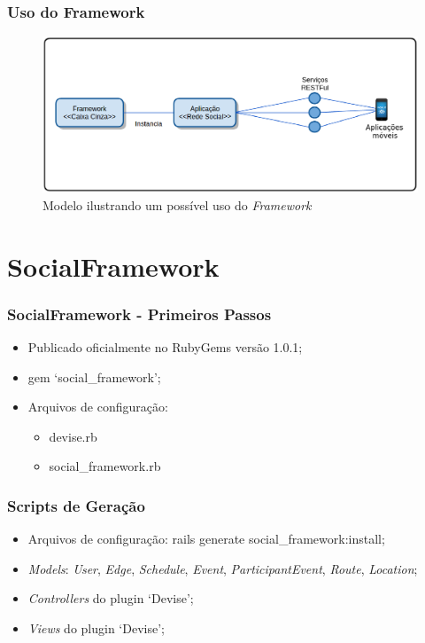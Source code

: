 \documentclass{beamer}
\begin{document}
\begin{frame}
\frametitle{Uso do Framework}

\begin{figure}[!h]
	\centering
	\includegraphics[scale=0.45]{../figuras/proposta/uso_proposto.eps}
	\caption{Modelo ilustrando um possível uso do \textit{Framework}}
	\label{uso_proposto}
\end{figure}

\end{frame}

\section{SocialFramework}

\begin{frame}
\frametitle{SocialFramework - Primeiros Passos}

\begin{itemize}
	\item Publicado oficialmente no RubyGems versão 1.0.1;
	\item gem `social\_framework';
	\item Arquivos de configuração:
	\begin{itemize}
		\item devise.rb
		\item social\_framework.rb
	\end{itemize}
\end{itemize}

\end{frame}

\begin{frame}
\frametitle{Scripts de Geração}

\begin{itemize}
	\item Arquivos de configuração: rails generate social\_framework:install;
	\item \textit{Models}: \textit{User}, \textit{Edge}, \textit{Schedule}, \textit{Event}, \textit{ParticipantEvent}, \textit{Route}, \textit{Location};
	\item \textit{Controllers} do plugin `Devise';
	\item \textit{Views} do plugin `Devise';
\end{itemize}

\end{frame}
\end{document}
